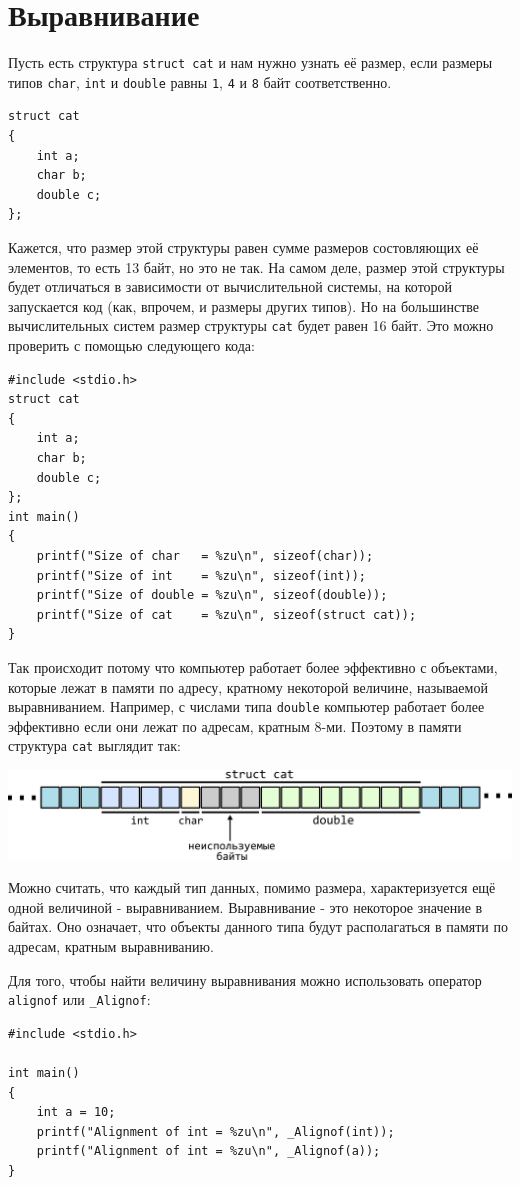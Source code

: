 \documentclass{article}
\begin{document}
\newpage
\section*{Выравнивание}
Пусть есть структура \texttt{struct cat} и нам нужно узнать её размер, если размеры типов \texttt{char}, \texttt{int} и \texttt{double} равны \texttt{1}, \texttt{4} и \texttt{8} байт соответственно.
\begin{lstlisting}
struct cat 
{
    int a;
    char b;
    double c;
};
\end{lstlisting}
Кажется, что размер этой структуры равен сумме размеров состовляющих её элементов, то есть 13 байт, но это не так. На самом деле, размер этой структуры будет отличаться в зависимости от вычислительной системы, на которой запускается код (как, впрочем, и размеры других типов). Но на большинстве вычислительных систем размер структуры \texttt{cat} будет равен 16 байт. Это можно проверить с помощью следующего кода:
\begin{lstlisting}
#include <stdio.h>
struct cat 
{
    int a;
    char b;
    double c;
};
int main() 
{
    printf("Size of char   = %zu\n", sizeof(char));
    printf("Size of int    = %zu\n", sizeof(int));
    printf("Size of double = %zu\n", sizeof(double));
    printf("Size of cat    = %zu\n", sizeof(struct cat));
}
\end{lstlisting}

Так происходит потому что компьютер работает более эффективно с объектами, которые лежат в памяти по адресу, кратному некоторой величине, называемой выравниванием. Например, с числами типа \texttt{double} компьютер работает более эффективно если они лежат по адресам, кратным 8-ми. Поэтому в памяти структура \texttt{cat} выглядит так: 

\begin{center}
\includegraphics[scale=1]{../images/alignment.png}
\end{center}

Можно считать, что каждый тип данных, помимо размера, характеризуется ещё одной величиной - выравниванием. Выравнивание - это некоторое значение в байтах. Оно означает, что объекты данного типа будут располагаться в памяти по адресам, кратным выравниванию.

Для того, чтобы найти величину выравнивания можно использовать оператор \texttt{alignof} или \texttt{\_Alignof}:
\begin{lstlisting}
#include <stdio.h>

int main() 
{
    int a = 10;
    printf("Alignment of int = %zu\n", _Alignof(int));
    printf("Alignment of int = %zu\n", _Alignof(a));
}
\end{lstlisting}
\end{document}
